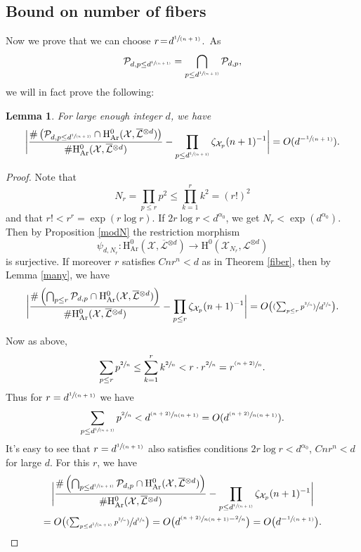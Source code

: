 \documentclass[JEP,XML,SOM,Unicode,published]{cedram}
\newcommand{\psfrac}[2]{\sfrac{(#1)}{#2}}
\newcommand{\spfrac}[2]{\sfrac{#1}{(#2)}}
\theoremstyle{plain}
\newtheorem{lem}[thm]{Lemma}
\theoremstyle{definition}
\newcommand{\ho}{\mathrm{H}}
\newcommand{\X}{\mathcal{X}}
\newcommand{\Li}{\overline{\mathcal{L}}{}}
\newcommand{\li}{\mathcal{L}}
\begin{document}
\subsection{Bound on number of fibers}\mbox{}%
\!Now we prove that we can choose \hbox{$r\!=\!d^{\spfrac{1}{n+1}}$.~As}
\[
\mathcal{P}_{d, p\leq d^{\spfrac{1}{n+1}}}=\bigcap_{p\leq d^{\spfrac{1}{n+1}}}\mathcal{P}_{d,p},
\]
we will in fact prove the following:
\begin{lem}\label{br}
For large enough integer $d$, we have
\[
\biggl| \frac{\#\left(\mathcal{P}_{d, p\leq d^{\spfrac{1}{n+1}}}\cap \ho^0_{\mathrm{Ar}}(\X, \overline{\mathcal{L}}{}^{\otimes d})\right)}{\#\ho^0_{\mathrm{Ar}}(\X, \overline{\mathcal{L}}{}^{\otimes d})} -\prod_{p\leq d^{\spfrac{1}{n+1}}}\zeta_{\X_p}(n+1)^{-1} \biggr|=O(d^{-\spfrac{1}{n+1}}).
\]
\end{lem}
\begin{proof}
Note that
\[
N_r=\prod_{p\leq r}p^2\leq \prod_{k=1}^r k^2=(r!)^2
\]
and that $r!< r^r=\exp(r\log r)$. If $2r\log r<d^{\alpha_0}$, we get $N_r< \exp(d^{\alpha_0})$. Then by Proposition \ref{modN} the restriction morphism
\[
\psi_{d,N_r}: \ho^0_{\mathrm{Ar}}(\X,\Li^{\otimes d}) \to \ho^0(\X_{N_r},\li^{\otimes d})
\]
is surjective. If moreover $r$ satisfies $Cnr^n<d$ as in Theorem \ref{fiber}, then by Lemma \ref{many}, we have
\[
\biggl| \frac{\#\left(\bigcap_{p\leq r}\mathcal{P}_{d,p}\cap \ho^0_{\mathrm{Ar}}(\X, \Li^{\otimes d})\right)}{\#\ho^0_{\mathrm{Ar}}(\X, \Li^{\otimes d})} -\prod_{p\leq r}\zeta_{\X_p}(n+1)^{-1} \biggr| =O\bigl(\psfrac{\textstyle\sum_{p\leq r} p^{\sfrac{2}{n}}}{d^{\sfrac{2}{n}}} \bigr).
\]

Now as above,
\begin{align*}
\sum_{p\leq r}p^{\sfrac{2}{n}} \leq \sum_{k=1}^r k^{\sfrac{2}{n}} < r\cdot r^{\sfrac{2}{n}}= r^{\psfrac{n+2}{n}}.
\end{align*}
Thus for $r=d^{\spfrac{1}{n+1}}$ we have
\[
\sum_{p\leq d^{\spfrac{1}{n+1}}}p^{\sfrac{2}{n}}<d^{\psfrac{n+2}{n(n+1)}}=O(d^{\psfrac{n+2}{n(n+1)}}).
\]
It's easy to see that $r=d^{\spfrac{1}{n+1}}$ also satisfies conditions $2r\log r<d^{\alpha_0}$, $Cnr^n<d$ for large $d$. For this $r$, we have
\begin{multline*}
\biggl| \frac{\#\left(\bigcap_{p\leq d^{\spfrac{1}{n+1}}}\mathcal{P}_{d,p}\cap \ho^0_{\mathrm{Ar}}(\X, \overline{\mathcal{L}}{}^{\otimes d})\right)}{\#\ho^0_{\mathrm{Ar}}(\X, \overline{\mathcal{L}}{}^{\otimes d})} -\prod_{p\leq d^{\spfrac{1}{n+1}}}\zeta_{\X_p}(n+1)^{-1} \biggr|\\
=O\bigl(\psfrac{\textstyle\sum_{p\leq d^{\spfrac{1}{n+1}}}p^{\sfrac{2}{n}}}{d^{\sfrac{2}{n}}} \bigr)
=O\bigl(d^{\psfrac{n+2}{n(n+1)}-\sfrac{2}{n}}\bigr)=O\bigl(d^{-\spfrac{1}{n+1}}\bigr).
\end{multline*}
\end{proof}
\end{document}
